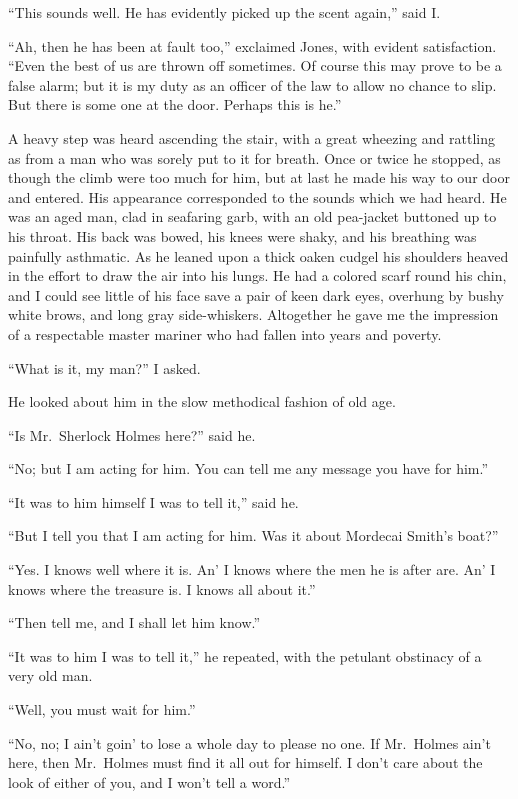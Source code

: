 \documentclass[12pt,english,oneside]{book}
\begin{document}
{}``This sounds well. He has evidently picked up the scent again,''
said I.

{}``Ah, then he has been at fault too,'' exclaimed Jones, with evident
satisfaction. {}``Even the best of us are thrown off sometimes. Of
course this may prove to be a false alarm; but it is my duty as an
officer of the law to allow no chance to slip. But there is some one
at the door. Perhaps this is he.''

A heavy step was heard ascending the stair, with a great wheezing
and rattling as from a man who was sorely put to it for breath. Once
or twice he stopped, as though the climb were too much for him, but
at last he made his way to our door and entered. His appearance corresponded
to the sounds which we had heard. He was an aged man, clad in seafaring
garb, with an old pea-jacket buttoned up to his throat. His back was
bowed, his knees were shaky, and his breathing was painfully asthmatic.
As he leaned upon a thick oaken cudgel his shoulders heaved in the
effort to draw the air into his lungs. He had a colored scarf round
his chin, and I could see little of his face save a pair of keen dark
eyes, overhung by bushy white brows, and long gray side-whiskers.
Altogether he gave me the impression of a respectable master mariner
who had fallen into years and poverty.

{}``What is it, my man?'' I asked.

He looked about him in the slow methodical fashion of old age.

{}``Is Mr.\ Sherlock Holmes here?'' said he.

{}``No; but I am acting for him. You can tell me any message you
have for him.''

{}``It was to him himself I was to tell it,'' said he.

{}``But I tell you that I am acting for him. Was it about Mordecai
Smith's boat?''

{}``Yes. I knows well where it is. An' I knows where the men he is
after are. An' I knows where the treasure is. I knows all about it.''

{}``Then tell me, and I shall let him know.''

{}``It was to him I was to tell it,'' he repeated, with the petulant
obstinacy of a very old man.

{}``Well, you must wait for him.''

{}``No, no; I ain't goin' to lose a whole day to please no one. If
Mr.\ Holmes ain't here, then Mr.\ Holmes must find it all out for
himself. I don't care about the look of either of you, and I won't
tell a word.''
\end{document}
